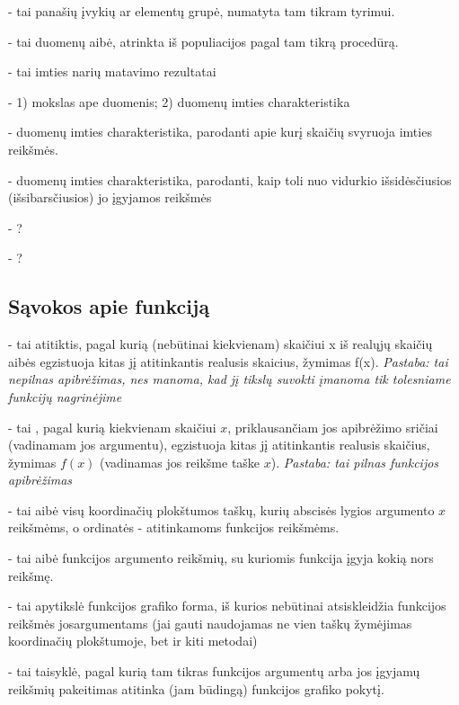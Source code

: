 \documentclass{article}
\begin{document}
 - tai panašių įvykių ar elementų grupė, numatyta tam tikram tyrimui. \par
{} - tai duomenų aibė, atrinkta iš populiacijos pagal tam tikrą procedūrą. \par
{} - tai imties narių matavimo rezultatai \par
{} - 1) mokslas ape duomenis; 2) duomenų imties charakteristika \par
{} - duomenų imties charakteristika, parodanti apie kurį skaičių svyruoja imties reikšmės. \par
{} - duomenų imties charakteristika, parodanti, kaip toli nuo vidurkio išsidėsčiusios (išsibarsčiusios) jo įgyjamos reikšmės\par
{} - ? \par
{} - ?

\subsection*{Sąvokos apie funkciją}

 - tai atitiktis, pagal kurią (nebūtinai kiekvienam) skaičiui x iš realųjų skaičių aibės egzistuoja kitas jį atitinkantis realusis skaicius, žymimas f(x). \textit{Pastaba: tai nepilnas apibrėžimas, nes manoma, kad jį tikslų suvokti įmanoma tik tolesniame funkcijų nagrinėjime}\par
{} - tai , pagal kurią kiekvienam skaičiui $x$, priklausančiam jos apibrėžimo sričiai (vadinamam jos argumentu), egzistuoja kitas jį atitinkantis realusis skaičius, žymimas $f(x)$ (vadinamas jos reikšme taške $x$). \textit{Pastaba: tai pilnas funkcijos apibrėžimas}\par
{} - tai aibė visų koordinačių plokštumos taškų, kurių abscisės lygios argumento $x$ reikšmėms, o ordinatės - atitinkamoms funkcijos reikšmėms. \par
{} - tai aibė funkcijos argumento reikšmių, su kuriomis funkcija įgyja kokią nors reikšmę. \par
{} - tai apytikslė funkcijos grafiko forma, iš kurios nebūtinai atsiskleidžia funkcijos reikšmės josargumentams (jai gauti naudojamas ne vien taškų žymėjimas koordinačių plokštumoje, bet ir kiti metodai) \par
{} - tai taisyklė, pagal kurią tam tikras funkcijos argumentų arba jos įgyjamų reikšmių pakeitimas atitinka (jam būdingą) funkcijos grafiko pokytį.
\end{document}

